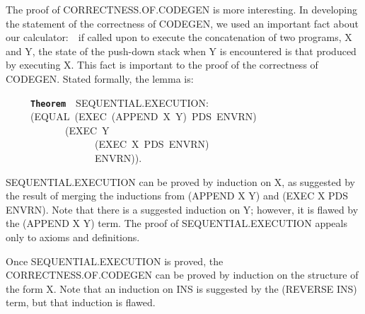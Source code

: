 \documentclass[11pt]{book}
\newenvironment{pubasis}{\begin{flushleft}\ttfamily\small}{\normalsize\rmfamily\end{flushleft}}
\newcommand{\axiomordefinition}[1]{\vspace{6pt}\texttt{\textbf{#1}}}
\begin{document}
The proof of CORRECT\-NESS.OF.CODEGEN is more interesting.
In developing the statement of the correctness of CODEGEN, we used an important fact
about our calculator:~~if called upon to execute the concatenation of
two programs, X and Y, the state of the push-down stack when Y is encountered
is   that produced by executing X.  This fact is important
to the proof of the correctness of CODEGEN.  Stated formally, the lemma is:
\begin{pubasis}
~~~~~\axiomordefinition{Theorem}~~SEQUENTIAL.EXECUTION:\\
~~~~~(EQUAL~(EXEC~(APPEND~X~Y)~PDS~ENVRN)\\
~~~~~~~~~~~~(EXEC~Y\\
~~~~~~~~~~~~~~~~~~(EXEC~X~PDS~ENVRN)\\
~~~~~~~~~~~~~~~~~~ENVRN)).\\
\end{pubasis}
SEQUENTIAL.EXECUTION can be proved by induction on X, as suggested by
the result of merging the inductions from (APPEND X Y) and (EXEC X PDS ENVRN).  Note that there is a suggested
induction on Y; however, it is flawed by the (APPEND X Y) term.
The proof of SEQUENTIAL.EXECUTION appeals only to axioms and
definitions.

Once SEQUENTIAL.EXECUTION is proved, the CORRECT\-NESS.OF.CODEGEN can be proved
by induction on the structure of the form X.  Note that an induction
on INS is suggested by the (REVERSE INS) term, but that induction is
flawed.
\end{document}
